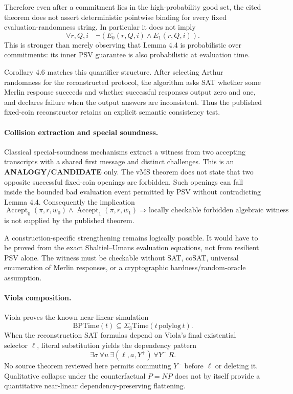 \documentclass[11pt]{article}
\begin{document}
Therefore even after a commitment lies in the high-probability good set, the cited theorem does not assert deterministic pointwise binding for every fixed evaluation-randomness string. In particular it does not imply
\[
\forall r,Q,i\quad \neg(E_0(r,Q,i)\wedge E_1(r,Q,i)).
\]
This is stronger than merely observing that Lemma 4.4 is probabilistic over commitments: its inner PSV guarantee is also probabilistic at evaluation time.

Corollary 4.6 matches this quantifier structure. After selecting Arthur randomness for the reconstructed protocol, the algorithm asks SAT whether some Merlin response succeeds and whether successful responses output zero and one, and declares failure when the output answers are inconsistent. Thus the published fixed-coin reconstructor retains an explicit semantic consistency test.

\paragraph{Collision extraction and special soundness.}
Classical special-soundness mechanisms extract a witness from two accepting transcripts with a shared first message and distinct challenges. This is an \textbf{ANALOGY/CANDIDATE} only. The vMS theorem does not state that two opposite successful fixed-coin openings are forbidden. Such openings can fall inside the bounded bad evaluation event permitted by PSV without contradicting Lemma 4.4. Consequently the implication
\[
\operatorname{Accept}_0(\pi,r,w_0)\wedge
\operatorname{Accept}_1(\pi,r,w_1)
\Longrightarrow
\text{locally checkable forbidden algebraic witness}
\]
is not supplied by the published theorem.

A construction-specific strengthening remains logically possible. It would have to be proved from the exact Shaltiel--Umans evaluation equations, not from resilient PSV alone. The witness must be checkable without SAT, coSAT, universal enumeration of Merlin responses, or a cryptographic hardness/random-oracle assumption.

\paragraph{Viola composition.}
Viola proves the known near-linear simulation
\[
\mathrm{BPTime}(t)\subseteq\Sigma_3\mathrm{Time}(t\,\mathrm{polylog}\,t).
\]
When the reconstruction SAT formulas depend on Viola's final existential selector $\ell$, literal substitution yields the dependency pattern
\[
\boxed{
\exists\sigma\ \forall u\ \exists(\ell,a,Y^+)\ \forall Y^-\ R
}.
\]
No source theorem reviewed here permits commuting $Y^-$ before $\ell$ or deleting it. Qualitative collapse under the counterfactual $P=NP$ does not by itself provide a quantitative near-linear dependency-preserving flattening.
\end{document}
